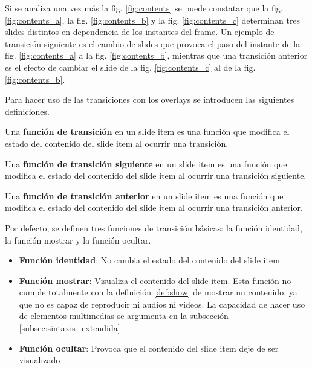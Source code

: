  		Si se analiza una vez más la fig. \ref{fig:contents} se puede constatar que la fig. \ref{fig:contents_a}, la fig. \ref{fig:contents_b} y la fig. \ref{fig:contents_c} determinan tres slides distintos en dependencia de los instantes del frame. Un ejemplo de transición siguiente es el cambio de slides que provoca el paso del instante de la fig. \ref{fig:contents_a} a la fig. \ref{fig:contents_b}, mientras que una transición anterior es el efecto de cambiar el slide de la fig. \ref{fig:contents_c} al de la fig. \ref{fig:contents_b}.


		Para hacer uso de las transiciones con los overlays se introducen las siguientes definiciones.

		\begin{definition}
		\label{def:transition_func}
			Una \textbf{función de transición} en un slide item es una función que modifica el estado del contenido del slide item al ocurrir una transición.
		\end{definition}

		\begin{definition}
		\label{def:next_transition_func}
			Una \textbf{función de transición siguiente} en un slide item es una función que modifica el estado del contenido del slide item al ocurrir una transición siguiente.
		\end{definition}

		\begin{definition}
		\label{def:prev_transition_func}
			Una \textbf{función de transición anterior} en un slide item es una función que modifica el estado del contenido del slide item al ocurrir una transición anterior.
		\end{definition}

		Por defecto, se definen tres funciones de transición básicas: la función identidad, la función mostrar y la función ocultar.
		\begin{itemize}
		\label{it:basic_functions}
			\item \textbf{Función identidad}: No cambia el estado del contenido del slide item
			\item \textbf{Función mostrar}: Visualiza el contenido del slide item. Esta función no cumple totalmente con la definición \ref{def:show} de mostrar un contenido, ya que no es capaz de reproducir ni audios ni videos. La capacidad de hacer uso de elementos multimedias se argumenta en la subsección \ref{subsec:sintaxis_extendida} 
			\item \textbf{Función ocultar}: Provoca que el contenido del slide item deje de ser visualizado
		\end{itemize}

